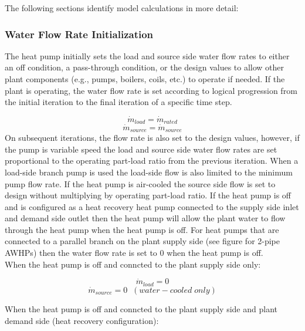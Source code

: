 The following sections identify model calculations in more detail:

\subsubsection{Water Flow Rate Initialization}\label{eir-air-to-water-heat-pumps-water-flow-rate-initialization}
The heat pump initially sets the load and source side water flow rates to either an off condition, a pass-through condition, or the design values to allow other plant components (e.g., pumps, boilers, coils, etc.) to operate if needed. If the plant is operating, the water flow rate is set according to logical progression from the initial iteration to the final iteration of a specific time step.

\begin{equation}
\dot{m}_{load} = \dot{m}_{rated}
\end{equation}
\begin{equation}
\dot{m}_{source} = \dot{m}_{source}
\end{equation}
On subsequent iterations, the flow rate is also set to the design values, however, if the pump is variable speed the load and source side water flow rates are set proportional to the operating part-load ratio from the previous iteration. When a load-side branch pump is used the load-side flow is also limited to the minimum pump flow rate. If the heat pump is air-cooled the source side flow is set to design without multiplying by operating part-load ratio. If the heat pump is off and is configured as a heat recovery heat pump connected to the supply side inlet and demand side outlet then the heat pump will allow the plant water to flow through the heat pump when the heat pump is off. For heat pumps that are connected to a parallel branch on the plant supply side (see figure for 2-pipe AWHPs) then the water flow rate is set to 0 when the heat pump is off.\\

When the heat pump is off and conncted to the plant supply side only:

\begin{equation}
\dot{m}_{load} = 0
\end{equation}
\begin{equation}
\dot{m}_{source} = 0\;\; (water-cooled\;only)
\end{equation}

When the heat pump is off and conncted to the plant supply side and plant demand side (heat recovery configuration):

